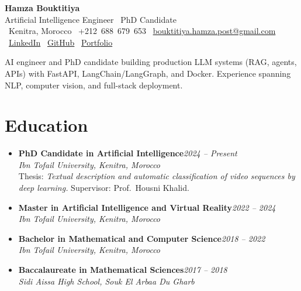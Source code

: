 \documentclass[10pt,a4paper]{article}
\newcommand{\cvname}[1]{{\Huge\bfseries\color{ink}#1}}
\newcommand{\cvtitle}[1]{{\large\color{muted}#1}}
\newcommand{\cvmeta}[1]{{\footnotesize\color{muted}#1}}
\newcommand{\role}[2]{\textbf{#1}\hfill\textit{\color{muted}#2}\\}
\newcommand{\org}[1]{\textit{#1}\\[0.5pt]}
\begin{document}
\normalsize
\setlength{\tabcolsep}{0pt}

\begin{center}
    \cvname{Hamza Bouktitiya}\\[2pt]
    \cvtitle{Artificial Intelligence Engineer \textbullet\ PhD Candidate}\\[4pt]
    \cvmeta{%
        \faMapMarker*\ Kenitra, Morocco
        \quad\textbullet\quad
        \faPhone*\ +212~688~679~653
        \quad\textbullet\quad
        \faEnvelope*\ \href{mailto:bouktitiya.hamza.post@gmail.com}{bouktitiya.hamza.post@gmail.com}
    }\\[2pt]
    \cvmeta{%
        \faLinkedin*\ \href{https://www.linkedin.com/in/hamza-bouktitiya-604471253/}{LinkedIn}
        \quad\textbullet\quad
        \faGithub*\ \href{https://github.com/gothamza}{GitHub}
        \quad\textbullet\quad
        \faGlobe*\ \href{https://gothamza.github.io/portfolio/}{Portfolio}
    }
\end{center}

\vspace{1pt}
{\footnotesize\color{ink}
AI engineer and PhD candidate building production LLM systems (RAG, agents, APIs) with FastAPI, LangChain/LangGraph, and Docker. Experience spanning NLP, computer vision, and full-stack deployment.}

\section*{Education}
\begin{itemize}
    \item \role{PhD Candidate in Artificial Intelligence}{2024 -- Present}
          \org{Ibn Tofail University, Kenitra, Morocco}
          Thesis: \textit{Textual description and automatic classification of video sequences by deep learning.}
          Supervisor: Prof.\ Housni Khalid.

    \item \role{Master in Artificial Intelligence and Virtual Reality}{2022 -- 2024}
          \org{Ibn Tofail University, Kenitra, Morocco}

    \item \role{Bachelor in Mathematical and Computer Science}{2018 -- 2022}
          \org{Ibn Tofail University, Kenitra, Morocco}

    \item \role{Baccalaureate in Mathematical Sciences}{2017 -- 2018}
          \org{Sidi Aissa High School, Souk El Arbaa Du Gharb}
\end{itemize}
\end{document}

